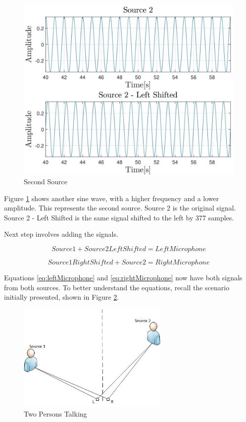 \begin{figure}[htp]
	\centering
	\includegraphics[width=\textwidth]{Illustrations/source2.jpg}
	\caption{Second Source}
	\label{fig:source2}
\end{figure}


Figure \ref{fig:source2} shows another sine wave, with a higher frequency and a lower amplitude. This 
represents the second source. Source 2 is the original signal. Source 2 - Left Shifted is the same signal
shifted to the left by 377 samples.

Next step involves adding the signals.

\begin{equation}
	Source1 + Source2LeftShifted = LeftMicrophone
	\label{eq:leftMicrophone}
\end{equation}


\begin{equation}
	Source1RightShifted + Source2 = RightMicrophone
	\label{eq:rightMicrophone}
\end{equation}

Equations \ref{eq:leftMicrophone} and \ref{eq:rightMicrophone} now have both signals from both sources.
To better understand the equations, recall the scenario initially presented, shown in Figure
\ref{fig:2sources2}.

\begin{figure}[htp]
	\centering
	\includegraphics[width=0.65\textwidth]{Illustrations/2sources.jpg}
	\caption{Two Persons Talking}
	\label{fig:2sources2}
\end{figure}

